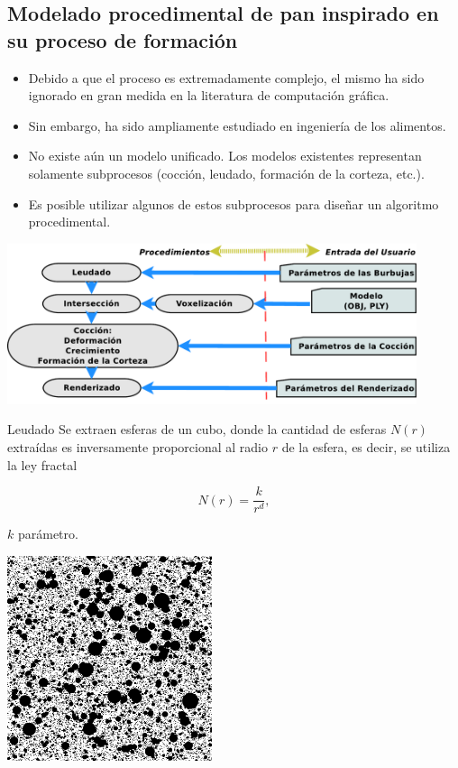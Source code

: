 \documentclass[spanish]{beamer}
\begin{document}
\subsection{Modelado procedimental de pan inspirado en su proceso de formación}
\begin{frame}
\begin{itemize}
\item Debido a que el proceso es extremadamente complejo, el mismo ha sido ignorado en gran medida en la literatura de computación gráfica.

\item Sin embargo, ha sido ampliamente estudiado en ingeniería de los alimentos.

\item No existe aún un modelo unificado. Los modelos existentes representan solamente subprocesos (cocción, leudado, formación de la corteza, etc.).

\item Es posible utilizar algunos de estos subprocesos para diseñar un algoritmo procedimental.
\end{itemize}
\end{frame}

\begin{frame}
\centerline{\includegraphics[width=12cm]{../figures/pipeline}}
\end{frame}

\begin{frame}{Leudado}
Se extraen esferas de un cubo, donde la cantidad de esferas $N(r)$ extraídas es inversamente proporcional al radio $r$ de la esfera, es decir, se utiliza la ley fractal

\begin{equation*}
N(r) = \frac{k}{r^{d}},
\end{equation*}

$k$ parámetro.

\centerline{\includegraphics[width=6cm]{../figures/bubbles}}
\end{frame}
\end{document}

